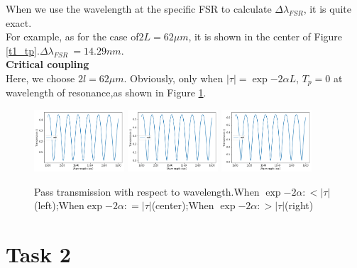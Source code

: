 \documentclass[fontsize=11pt]{scrartcl}
\begin{document}
When we use the wavelength at the specific FSR to calculate $\Delta\lambda_{FSR}$, it is quite exact.\\
For example, as for the case of$2L=62\mu m$, it is shown in the center of Figure \ref{t1_tp}.$\Delta\lambda_{FSR}~=14.29 nm$.\\
\textbf{Critical coupling}   \\
Here, we choose $2l=62\mu m$. Obviously, only when $|\tau |=\exp{-2\alpha L}$, $T_p=0$ at wavelength of resonance,as shown in Figure \ref{t1_tp_critical}.
\begin{figure}[ht]
    \centering
    \includegraphics[width=0.3\textwidth]{img/T1_ccs.png}
    \includegraphics[width=0.3\textwidth]{img/T1_cc.png}
    \includegraphics[width=0.3\textwidth]{img/T1_ccl.png}
    \caption{Pass transmission with respect to wavelength.When $\exp{-2\alpha:}<|\tau|$(left);When$\exp{-2\alpha:}=|\tau|$(center);When $\exp{-2\alpha:}>|\tau|$(right)}
    \label{t1_tp_critical}
\end{figure}


\section{Task 2}
\end{document}

